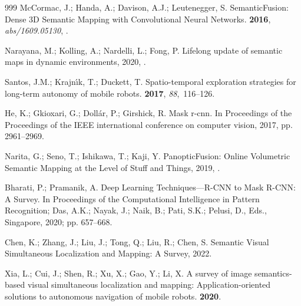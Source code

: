 \documentclass[10pt,a4paper]{article}
\begin{document}
\begin{thebibliography}{999}
McCormac, J.; Handa, A.; Davison, A.J.; Leutenegger, S.
\newblock SemanticFusion: Dense 3D Semantic Mapping with Convolutional Neural
  Networks.
 {\bf 2016}, {\em abs/1609.05130},
  \href{http://arxiv.org/abs/1609.05130}{{\normalfont [1609.05130]}}.

Narayana, M.; Kolling, A.; Nardelli, L.; Fong, P.
\newblock Lifelong update of semantic maps in dynamic environments,  2020,
  \href{http://arxiv.org/abs/2010.08846}{{\normalfont
  [arXiv:cs.RO/2010.08846]}}.

Santos, J.M.; Krajn{\'\i}k, T.; Duckett, T.
\newblock Spatio-temporal exploration strategies for long-term autonomy of
  mobile robots.
 {\bf 2017}, {\em 88},~116--126.

He, K.; Gkioxari, G.; Doll{\'a}r, P.; Girshick, R.
\newblock Mask r-cnn.
\newblock In Proceedings of the Proceedings of the IEEE international
  conference on computer vision,  2017, pp. 2961--2969.

Narita, G.; Seno, T.; Ishikawa, T.; Kaji, Y.
\newblock PanopticFusion: Online Volumetric Semantic Mapping at the Level of
  Stuff and Things,  2019,  \href{http://arxiv.org/abs/1903.01177}{{\normalfont
  [arXiv:cs.CV/1903.01177]}}.

Bharati, P.; Pramanik, A.
\newblock Deep Learning Techniques---R-CNN to Mask R-CNN: A Survey.
\newblock In Proceedings of the Computational Intelligence in Pattern
  Recognition; Das, A.K.; Nayak, J.; Naik, B.; Pati, S.K.; Pelusi, D., Eds.,
  Singapore,  2020; pp. 657--668.

Chen, K.; Zhang, J.; Liu, J.; Tong, Q.; Liu, R.; Chen, S.
\newblock Semantic Visual Simultaneous Localization and Mapping: A Survey,
  2022.

Xia, L.; Cui, J.; Shen, R.; Xu, X.; Gao, Y.; Li, X.
\newblock A survey of image semantics-based visual simultaneous localization
  and mapping: Application-oriented solutions to autonomous navigation of
  mobile robots.
 {\bf 2020}.


\end{thebibliography}
\end{document}
